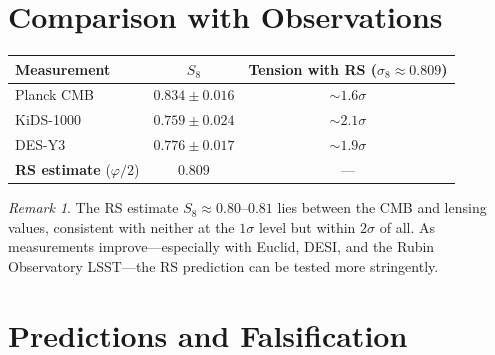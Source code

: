 \documentclass[12pt,a4paper]{article}
\theoremstyle{definition}
\theoremstyle{remark}
\newtheorem{remark}[theorem]{Remark}
\begin{document}
\section{Comparison with Observations}
\label{sec:compare}

\begin{center}
\renewcommand{\arraystretch}{1.3}
\begin{tabular}{@{}lcc@{}}
\toprule
\textbf{Measurement} & $S_8$ & \textbf{Tension with RS ($\sigma_8\approx 0.809$)} \\
\midrule
Planck CMB \cite{Planck2020} & $0.834 \pm 0.016$ & $\sim 1.6\sigma$ \\
KiDS-1000 \cite{Asgari2021} & $0.759 \pm 0.024$ & $\sim 2.1\sigma$ \\
DES-Y3 \cite{DES2022} & $0.776 \pm 0.017$ & $\sim 1.9\sigma$ \\
\textbf{RS estimate} ($\varphi/2$) & $\mathbf{0.809}$ & --- \\
\bottomrule
\end{tabular}
\end{center}

\begin{remark}
The RS estimate $S_8 \approx 0.80$--$0.81$ lies between the CMB and
lensing values, consistent with neither at the $1\sigma$ level but
within $2\sigma$ of all.  As measurements improve---especially with
Euclid, DESI, and the Rubin Observatory LSST---the RS prediction
can be tested more stringently.
\end{remark}

\section{Predictions and Falsification}
\label{sec:predict}
\end{document}
